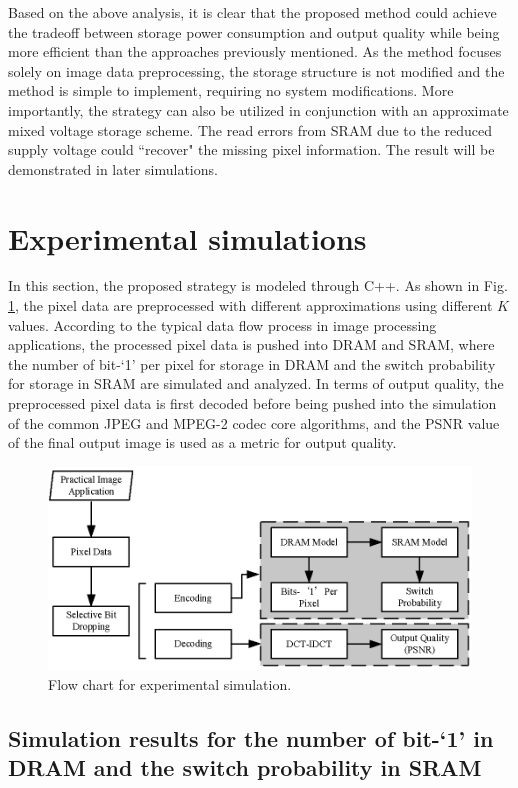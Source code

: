 \documentclass[lettersize,journal]{IEEEtran}
\begin{document}
Based on the above analysis, it is clear that the proposed method could achieve the tradeoff between storage power consumption and output quality while being more efficient than the approaches previously mentioned. As the method focuses solely on image data preprocessing, the storage structure is not modified and the method is simple to implement, requiring no system modifications. More importantly, the strategy can also be utilized in conjunction with an approximate mixed voltage storage scheme. The read errors from SRAM due to the reduced supply voltage could ``recover" the missing pixel information. The result will be demonstrated in later simulations.

\section{Experimental simulations} \label{sec4}

In this section, the proposed strategy is modeled through C++. As shown in Fig. \ref{fig6}, the pixel data are preprocessed with different approximations using different $K$ values. According to the typical data flow process in image processing applications, the processed pixel data is pushed into DRAM and SRAM, where the number of bit-`1' per pixel for storage in DRAM and the switch probability for storage in SRAM are simulated and analyzed. In terms of output quality, the preprocessed pixel data is first decoded before being pushed into the simulation of the common JPEG and MPEG-2 codec core algorithms, and the PSNR value of the final output image is used as a metric for output quality.
\begin{figure}[htb]
	\centering
	\includegraphics[width=\linewidth]{Fig/Flow chart for experimental simulation.png}
	\caption{Flow chart for experimental simulation.}
	\label{fig6}
\end{figure}

\subsection{Simulation results for the number of bit-`1' in DRAM and the switch probability in SRAM}
\end{document}

